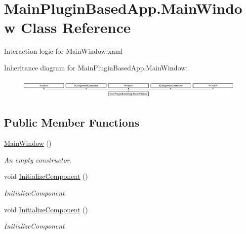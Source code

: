 \hypertarget{class_main_plugin_based_app_1_1_main_window}{}\section{Main\+Plugin\+Based\+App.\+Main\+Window Class Reference}
\label{class_main_plugin_based_app_1_1_main_window}


Interaction logic for Main\+Window.\+xaml  


Inheritance diagram for Main\+Plugin\+Based\+App.\+Main\+Window\+:\begin{figure}[H]
\begin{center}
\leavevmode
\includegraphics[height=1.032258cm]{d3/d87/class_main_plugin_based_app_1_1_main_window}
\end{center}
\end{figure}
\subsection*{Public Member Functions}
\begin{DoxyCompactItemize}
\item 
\mbox{\hyperlink{class_main_plugin_based_app_1_1_main_window_af58baec73d8fe22318982054355f4bad}{Main\+Window}} ()
\begin{DoxyCompactList}\small\item\em An empty constructor. \end{DoxyCompactList}\item 
void \mbox{\hyperlink{class_main_plugin_based_app_1_1_main_window_ae73da70593750fc1d513b9d372936734}{Initialize\+Component}} ()
\begin{DoxyCompactList}\small\item\em Initialize\+Component \end{DoxyCompactList}\item 
void \mbox{\hyperlink{class_main_plugin_based_app_1_1_main_window_ae73da70593750fc1d513b9d372936734}{Initialize\+Component}} ()
\begin{DoxyCompactList}\small\item\em Initialize\+Component \end{DoxyCompactList}\end{DoxyCompactItemize}
